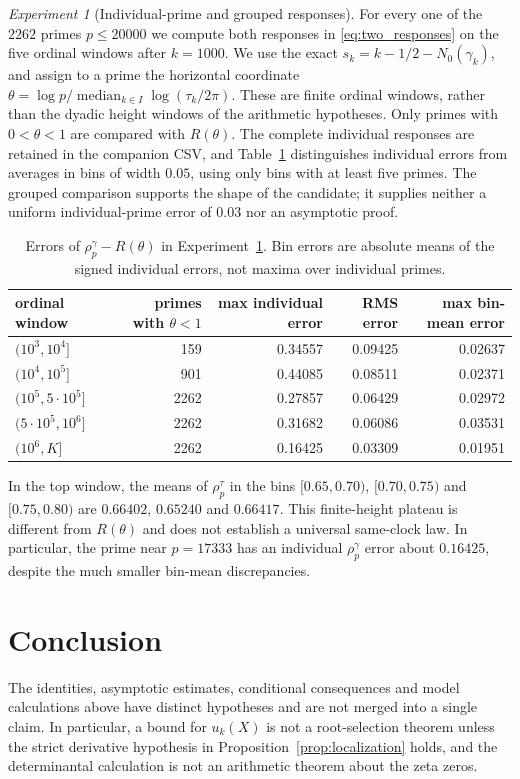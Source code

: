 \documentclass[11pt,reqno]{amsart}
\theoremstyle{plain}\newtheorem{theorem}{Theorem}[section]\newtheorem{proposition}[theorem]{Proposition}\newtheorem{lemma}[theorem]{Lemma}\newtheorem{corollary}[theorem]{Corollary}
\theoremstyle{definition}\newtheorem{hypothesis}[theorem]{Hypothesis}\newtheorem{definition}[theorem]{Definition}
\theoremstyle{remark}\newtheorem{remark}[theorem]{Remark}\newtheorem{experiment}[theorem]{Experiment}\newtheorem{question}[theorem]{Question}\newtheorem{heuristic}[theorem]{Heuristic}\newtheorem{conjecture}[theorem]{Conjecture}
\newcommand{\NO}{N_0}\newcommand{\lL}{\mathcal L}\newcommand{\IT}{\mathcal I_T}\newcommand{\R}{\mathbb R}\newcommand{\N}{\mathbb N}\newcommand{\eps}{\varepsilon}\newcommand{\sgn}{\operatorname{sgn}}
\begin{document}
\begin{experiment}[Individual-prime and grouped responses]\label{exp:moving_responses}
For every one of the $2262$ primes $p\le20000$ we compute both responses in \eqref{eq:two_responses} on the five ordinal windows after $k=1000$. We use the exact $s_k=k-1/2-\NO(\gamma_k)$, and assign to a prime the horizontal coordinate $\theta=\log p/\operatorname{median}_{k\in I}\log(\tau_k/2\pi)$. These are finite ordinal windows, rather than the dyadic height windows of the arithmetic hypotheses. Only primes with $0<\theta<1$ are compared with $R(\theta)$. The complete individual responses are retained in the companion CSV, and Table~\ref{tab:response_errors} distinguishes individual errors from averages in bins of width $0.05$, using only bins with at least five primes. The grouped comparison supports the shape of the candidate; it supplies neither a uniform individual-prime error of $0.03$ nor an asymptotic proof.
\end{experiment}
\begin{table}[htbp]
\centering\small
\begin{tabular}{lrrrr}
\toprule
ordinal window & primes with $\theta<1$ & max individual error & RMS error & max bin-mean error\\
\midrule
$(10^3,10^4]$ & 159 & 0.34557 & 0.09425 & 0.02637\\
$(10^4,10^5]$ & 901 & 0.44085 & 0.08511 & 0.02371\\
$(10^5,5\cdot10^5]$ & 2262 & 0.27857 & 0.06429 & 0.02972\\
$(5\cdot10^5,10^6]$ & 2262 & 0.31682 & 0.06086 & 0.03531\\
$(10^6,K]$ & 2262 & 0.16425 & 0.03309 & 0.01951\\
\bottomrule
\end{tabular}
\caption{Errors of $\rho_p^\gamma-R(\theta)$ in Experiment~\ref{exp:moving_responses}. Bin errors are absolute means of the signed individual errors, not maxima over individual primes.}
\label{tab:response_errors}
\end{table}
In the top window, the means of $\rho_p^\tau$ in the bins $[0.65,0.70)$, $[0.70,0.75)$ and $[0.75,0.80)$ are $0.66402$, $0.65240$ and $0.66417$. This finite-height plateau is different from $R(\theta)$ and does not establish a universal same-clock law. In particular, the prime near $p=17333$ has an individual $\rho_p^\gamma$ error about $0.16425$, despite the much smaller bin-mean discrepancies.


\section{Conclusion}
The identities, asymptotic estimates, conditional consequences and model calculations above have distinct hypotheses and are not merged into a single claim.  In particular, a bound for $u_k(X)$ is not a root-selection theorem unless the strict derivative hypothesis in Proposition~\ref{prop:localization} holds, and the determinantal calculation is not an arithmetic theorem about the zeta zeros.
\end{document}
